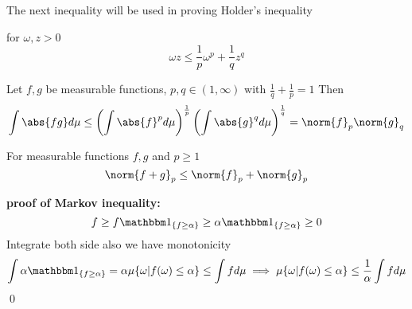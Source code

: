The next inequality will be used in proving Holder's inequality
\begin{thm} for $\omega, z > 0$
\begin{equation*}
    \omega z \leq \frac{1}{p} \omega^p + \frac{1}{q} z^q
\end{equation*}
\end{thm}
\begin{thm}\label{holder} Let $f, g$ be measurable functions, $p,q \in (1, \infty)$ with $\frac{1}{q}+\frac{1}{p} = 1$ Then
\begin{equation*}
    \int \abs{fg} d\mu \leq \left(\int \abs{f}^p  d\mu\right)^{\frac{1}{p}}\left(\int \abs{g}^q  d\mu\right)^{\frac{1}{q}} = \norm{f}_p \norm{g}_q
\end{equation*}
\end{thm}
\begin{thm}For measurable functions $f,g$ and $p\geq 1$
\begin{equation*}
    \norm{f+g}_p \leq \norm{f}_p +\norm{g}_p
\end{equation*}
\end{thm}

\newpage
\textbf{proof of Markov inequality:} \\
\pf \begin{equation*}
    f\geq f \I_{\{f\geq \alpha\}} \geq \alpha\I_{\{f\geq \alpha\}} \geq 0
\end{equation*}Integrate both side also we have monotonicity
\begin{equation*}
    \int \alpha\I_{\{f\geq \alpha\}} = \alpha\mu\{\omega| f(\omega) \leq \alpha\} \leq \int fd\mu \implies \mu\{\omega| f(\omega) \leq \alpha\} \leq \frac{1}{\alpha}\int fd\mu
\end{equation*}\qed

